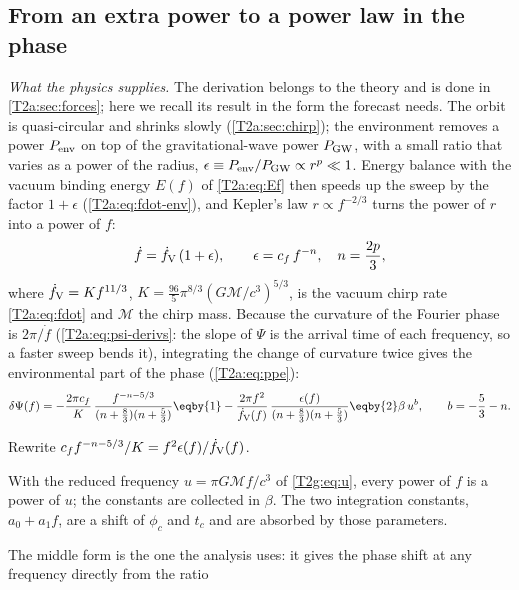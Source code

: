 \subsection{From an extra power to a power law in the phase}
\label{10b:sec:env-derive}

\emph{What the physics supplies.} The derivation belongs to the theory and is done in \cref{T2a:sec:forces}; here
we recall its result in the form the forecast needs. The orbit is quasi-circular and shrinks slowly
(\cref{T2a:sec:chirp}); the environment removes a power $P_{\rm env}$ on top of the gravitational-wave power
$P_{\rm GW}$, with a small ratio that varies as a power of the radius, $\epsilon\equiv P_{\rm env}/P_{\rm GW}\propto r^p\ll1$.
Energy balance with the vacuum binding energy $E(f)$ of \cref{T2a:eq:Ef} then speeds up the sweep by the factor
$1+\epsilon$ (\cref{T2a:eq:fdot-env}), and Kepler's law $r\propto f^{-2/3}$ turns the power of $r$ into a power of $f$:
\begin{equation}
  \dot f=\dot f_{\rm V}\,(1+\epsilon),
  \qquad
  \epsilon=c_f\,f^{-n},\quad n=\frac{2p}{3},
  \label{10b:eq:fdot-eps}
\end{equation}
where $\dot f_{\rm V}=Kf^{11/3}$, $K=\tfrac{96}5\pi^{8/3}(G\mathcal M/c^3)^{5/3}$, is the vacuum chirp rate
\eqref{T2a:eq:fdot} and $\mathcal M$ the chirp mass. Because the curvature of the Fourier phase is $2\pi/\dot f$
(\cref{T2a:eq:psi-derivs}: the slope of $\Psi$ is the arrival time of each frequency, so a faster sweep bends it),
integrating the change of curvature twice gives the environmental part of the phase (\cref{T2a:eq:ppe}):
\begin{equation}
  \delta\Psi(f)
  =-\frac{2\pi c_f}{K}\,\frac{f^{-n-5/3}}{(n+\frac83)(n+\frac53)}
  \eqby{1}-\frac{2\pi f^2}{\dot f_{\rm V}(f)}\,\frac{\epsilon(f)}{(n+\frac83)(n+\frac53)}
  \eqby{2}\beta\,u^{b},\qquad b=-\frac53-n .
  \label{10b:eq:dpsi-closed}
\end{equation}
\begin{explain}
  \item Rewrite $c_ff^{-n-5/3}/K=f^2\epsilon(f)/\dot f_{\rm V}(f)$.
  \item With the reduced frequency $u=\pi G\mathcal Mf/c^3$ of \eqref{T2g:eq:u}, every power of $f$ is a power of $u$;
        the constants are collected in $\beta$. The two integration constants, $a_0+a_1f$, are a shift of $\phi_c$
        and $t_c$ and are absorbed by those parameters.
\end{explain}
The middle form is the one the analysis uses: it gives the phase shift at any frequency directly from the ratio
